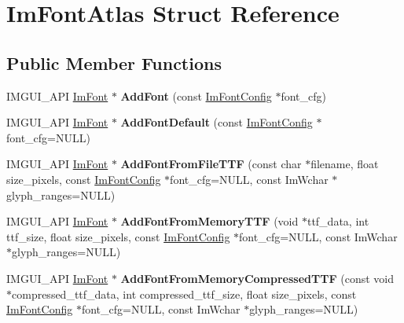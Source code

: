 \hypertarget{struct_im_font_atlas}{}\section{Im\+Font\+Atlas Struct Reference}
\label{struct_im_font_atlas}
\subsection*{Public Member Functions}
\begin{DoxyCompactItemize}
\item 
\mbox{\label{struct_im_font_atlas_a6d69b17370e226336805dc10c6c846f7}} 
I\+M\+G\+U\+I\+\_\+\+A\+PI \mbox{\hyperlink{struct_im_font}{Im\+Font}} $\ast$ {\bfseries Add\+Font} (const \mbox{\hyperlink{struct_im_font_config}{Im\+Font\+Config}} $\ast$font\+\_\+cfg)
\item 
\mbox{\label{struct_im_font_atlas_a9411cfe80efa6dd75598df24750a689e}} 
I\+M\+G\+U\+I\+\_\+\+A\+PI \mbox{\hyperlink{struct_im_font}{Im\+Font}} $\ast$ {\bfseries Add\+Font\+Default} (const \mbox{\hyperlink{struct_im_font_config}{Im\+Font\+Config}} $\ast$font\+\_\+cfg=N\+U\+LL)
\item 
\mbox{\label{struct_im_font_atlas_a5abe3743ceec480955777b994c2d27c0}} 
I\+M\+G\+U\+I\+\_\+\+A\+PI \mbox{\hyperlink{struct_im_font}{Im\+Font}} $\ast$ {\bfseries Add\+Font\+From\+File\+T\+TF} (const char $\ast$filename, float size\+\_\+pixels, const \mbox{\hyperlink{struct_im_font_config}{Im\+Font\+Config}} $\ast$font\+\_\+cfg=N\+U\+LL, const Im\+Wchar $\ast$glyph\+\_\+ranges=N\+U\+LL)
\item 
\mbox{\label{struct_im_font_atlas_a14a85a8c33b1a576ca753bcbcdc463a8}} 
I\+M\+G\+U\+I\+\_\+\+A\+PI \mbox{\hyperlink{struct_im_font}{Im\+Font}} $\ast$ {\bfseries Add\+Font\+From\+Memory\+T\+TF} (void $\ast$ttf\+\_\+data, int ttf\+\_\+size, float size\+\_\+pixels, const \mbox{\hyperlink{struct_im_font_config}{Im\+Font\+Config}} $\ast$font\+\_\+cfg=N\+U\+LL, const Im\+Wchar $\ast$glyph\+\_\+ranges=N\+U\+LL)
\item 
\mbox{\label{struct_im_font_atlas_a7c5dd2a05a6e2a1ec09f299957f056a2}} 
I\+M\+G\+U\+I\+\_\+\+A\+PI \mbox{\hyperlink{struct_im_font}{Im\+Font}} $\ast$ {\bfseries Add\+Font\+From\+Memory\+Compressed\+T\+TF} (const void $\ast$compressed\+\_\+ttf\+\_\+data, int compressed\+\_\+ttf\+\_\+size, float size\+\_\+pixels, const \mbox{\hyperlink{struct_im_font_config}{Im\+Font\+Config}} $\ast$font\+\_\+cfg=N\+U\+LL, const Im\+Wchar $\ast$glyph\+\_\+ranges=N\+U\+LL)

\end{DoxyCompactItemize}
